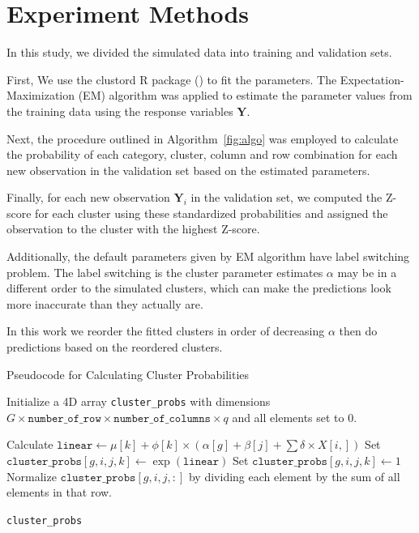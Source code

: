 \documentclass{article}
\begin{document}
\clearpage

\section{Experiment Methods}

In this study, we divided the simulated data into training and validation sets.

First, We use the clustord R package (\cite{clustord2024}) to fit the parameters. The Expectation-Maximization (EM) algorithm was applied to estimate the parameter values from the training data using the response variables $\bm{Y}$.

Next, the procedure outlined in Algorithm~\ref{fig:algo} was employed to calculate the probability of each category, cluster, column and row combination for each new observation in the validation set based on the estimated parameters.

Finally, for each new observation $\bm{Y}_i$ in the validation set, we computed the Z-score for each cluster using these standardized probabilities and assigned the observation to the cluster with the highest Z-score.

Additionally, the default parameters given by EM algorithm have label switching problem.
The label switching is the cluster parameter estimates $\alpha$ may be in a different order to the simulated clusters, which can make the predictions look more inaccurate than they actually are.

In this work we reorder the fitted clusters in order of decreasing $\alpha$ then do predictions based on the reordered clusters.

\begin{algorithm}
  \caption{Pseudocode for Calculating Cluster Probabilities}
  \label{fig:algo}
  \begin{algorithmic}[1]
  \STATE Initialize a 4D array \texttt{cluster\_probs} with dimensions $G \times \texttt{number\_of\_row} \times \texttt{number\_of\_columns} \times q$ and all elements set to 0.
  
                      \STATE Calculate $\texttt{linear} \gets \mu[k] + \phi[k] \times (\alpha[g] + \beta[j] + \sum \delta \times X[i,])$
                      \STATE Set $\texttt{cluster\_probs}[g, i, j, k] \gets \exp(\texttt{linear})$
                  \ELSE
                      \STATE Set $\texttt{cluster\_probs}[g, i, j, k] \gets 1$
                  \ENDIF
              \ENDFOR
              \STATE Normalize $\texttt{cluster\_probs}[g, i, j, :]$ by dividing each element by the sum of all elements in that row.
          \ENDFOR
      \ENDFOR
  \ENDFOR
  
  \RETURN \texttt{cluster\_probs}
  \end{algorithmic}
\end{algorithm}
\end{document}
